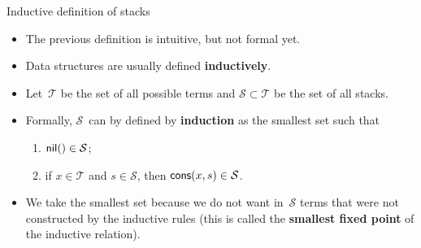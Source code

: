 %
\begin{frame}{Inductive definition of stacks}

  \begin{itemize}

    \item The previous definition is intuitive, but not formal yet.

    \item Data structures are usually defined \textbf{inductively}.

    \item Let~\(\mathcal{T}\) be the set of all possible terms and
      \(\mathcal{S} \subset \mathcal{T}\) be the set of all stacks.

    \item Formally, \(\mathcal{S}\)~can by defined by
      \textbf{induction} as the smallest set such that
      \begin{enumerate}

        \item \(\textsf{nil}() \in \mathcal{S}\);

        \item if \(x \in \mathcal{T}\) and \(s \in \mathcal{S}\), then
          \(\textsf{cons}(x,s) \in \mathcal{S}\).
      \end{enumerate}

    \item We take the smallest set because we do not want
      in~\(\mathcal{S}\) terms that were not constructed by the
      inductive rules (this is called the \textbf{smallest fixed
        point} of the inductive relation).

  \end{itemize}

\end{frame}

